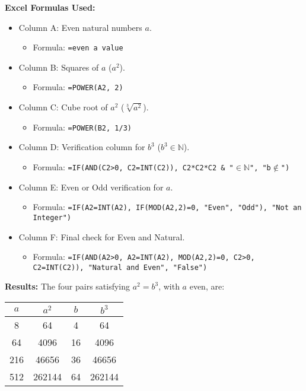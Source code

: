 \documentclass[12pt]{article}
\theoremstyle{definition}
\newcommand{\N}{\mathbb{N}} %
\begin{document}
\textbf{Excel Formulas Used:}
\begin{itemize}
    \item Column A: Even natural numbers \( a \).
        \begin{itemize}
            \item Formula: \texttt{=even a value}
        \end{itemize}
    \item Column B: Squares of \( a \) (\( a^2 \)).
        \begin{itemize}
            \item Formula: \texttt{=POWER(A2, 2)}
        \end{itemize}
    \item Column C: Cube root of \( a^2 \) (\( \sqrt[3]{a^2} \)).
        \begin{itemize}
            \item Formula: \texttt{=POWER(B2, 1/3)}
        \end{itemize}
    \item Column D: Verification column for \( b^3 \) (\( b^3 \in \N \)).
        \begin{itemize}
            \item Formula: \texttt{=IF(AND(C2>0, C2=INT(C2)), C2*C2*C2 \& "\(\in\mathbb{N}\)", "b\(\notin\)")}
        \end{itemize}
    \item Column E: Even or Odd verification for \( a \).
        \begin{itemize}
            \item Formula: \texttt{=IF(A2=INT(A2), IF(MOD(A2,2)=0, "Even", "Odd"), "Not an Integer")}
        \end{itemize}
    \item Column F: Final check for Even and Natural.
        \begin{itemize}
            \item Formula: \texttt{=IF(AND(A2>0, A2=INT(A2), MOD(A2,2)=0, C2>0, C2=INT(C2)), "Natural and Even", "False")}
        \end{itemize}
\end{itemize}

\textbf{Results:} The four pairs satisfying \( a^2 = b^3 \), with \( a \) even, are:
\begin{center}
    \begin{tabular}{|c|c|c|c|}
    \hline
    \( a \) & \( a^2 \) & \( b \) & \( b^3 \) \\
    \hline
    8 & 64 & 4 & 64 \\
    64 & 4096 & 16 & 4096 \\
    216 & 46656 & 36 & 46656 \\
    512 & 262144 & 64 & 262144 \\
    \hline
    \end{tabular}
\end{center}
\end{document}
